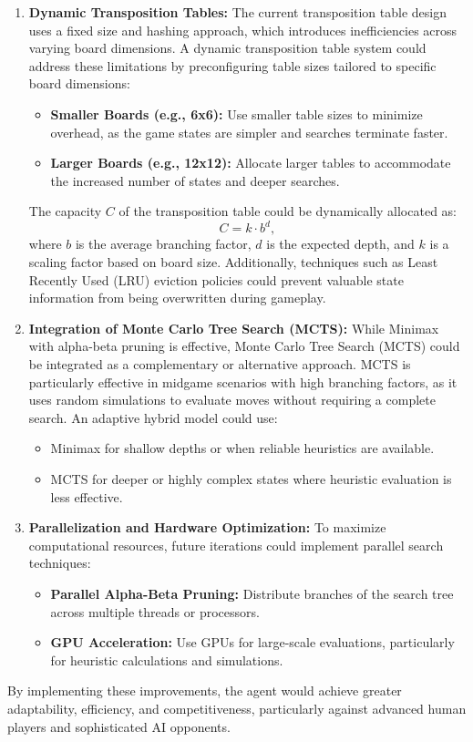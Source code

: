 \documentclass[11pt]{article}
\begin{document}
\begin{enumerate}
    \item \textbf{Dynamic Transposition Tables:}
    The current transposition table design uses a fixed size and hashing approach, which introduces inefficiencies across varying board dimensions. A dynamic transposition table system could address these limitations by preconfiguring table sizes tailored to specific board dimensions:
    \begin{itemize}
        \item \textbf{Smaller Boards (e.g., 6x6):} Use smaller table sizes to minimize overhead, as the game states are simpler and searches terminate faster.
        \item \textbf{Larger Boards (e.g., 12x12):} Allocate larger tables to accommodate the increased number of states and deeper searches.
    \end{itemize}
    The capacity \(C\) of the transposition table could be dynamically allocated as:
    \[
    C = k \cdot b^d,
    \]
    where \(b\) is the average branching factor, \(d\) is the expected depth, and \(k\) is a scaling factor based on board size. Additionally, techniques such as Least Recently Used (LRU) eviction policies could prevent valuable state information from being overwritten during gameplay.

    \item \textbf{Integration of Monte Carlo Tree Search (MCTS):}
    While Minimax with alpha-beta pruning is effective, Monte Carlo Tree Search (MCTS) could be integrated as a complementary or alternative approach. MCTS is particularly effective in midgame scenarios with high branching factors, as it uses random simulations to evaluate moves without requiring a complete search. An adaptive hybrid model could use:
    \begin{itemize}
        \item Minimax for shallow depths or when reliable heuristics are available.
        \item MCTS for deeper or highly complex states where heuristic evaluation is less effective.
    \end{itemize}

    \item \textbf{Parallelization and Hardware Optimization:}
    To maximize computational resources, future iterations could implement parallel search techniques:
    \begin{itemize}
        \item \textbf{Parallel Alpha-Beta Pruning:} Distribute branches of the search tree across multiple threads or processors.
        \item \textbf{GPU Acceleration:} Use GPUs for large-scale evaluations, particularly for heuristic calculations and simulations.
    \end{itemize}


\end{enumerate}

By implementing these improvements, the agent would achieve greater adaptability, efficiency, and competitiveness, particularly against advanced human players and sophisticated AI opponents.
\end{document}
